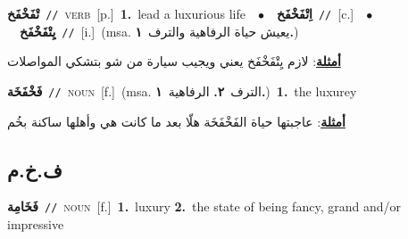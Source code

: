 \documentclass[10pt,a4paper,twoside]{article} %
\begin{document}
\begin{multicols}{2}
{\setlength\topsep{0pt}\textbf{\foreignlanguage{arabic}{تْفَخْفَخ}}\ {\color{gray}\texttt{//}\color{black}}\ \textsc{verb}\ [p.]\ \textbf{1.}~lead a luxurious life\ \ $\bullet$\ \ \setlength\topsep{0pt}\textbf{\foreignlanguage{arabic}{اِتْفَخْفَخ}}\ {\color{gray}\texttt{//}\color{black}}\ [c.]\ \ $\bullet$\ \ \setlength\topsep{0pt}\textbf{\foreignlanguage{arabic}{يِتْفَخْفَخ}}\ {\color{gray}\texttt{//}\color{black}}\ [i.]\ \color{gray}(msa. \foreignlanguage{arabic}{يعيش حياة الرفاهية والترف}~\foreignlanguage{arabic}{\textbf{١.}})\color{black}\  \begin{flushright}\color{gray}\foreignlanguage{arabic}{\textbf{\underline{\foreignlanguage{arabic}{أمثلة}}}: لازم يِتْفَخْفَخ يعني ويجيب سيارة من شو بتشكي المواصلات}\end{flushright}\color{black}} \vspace{2mm}

{\setlength\topsep{0pt}\textbf{\foreignlanguage{arabic}{فَخْفَخَة}}\ {\color{gray}\texttt{//}\color{black}}\ \textsc{noun}\ [f.]\ \color{gray}(msa. \foreignlanguage{arabic}{الترف}~\foreignlanguage{arabic}{\textbf{٢.}}  \foreignlanguage{arabic}{الرفاهية}~\foreignlanguage{arabic}{\textbf{١.}})\color{black}\ \textbf{1.}~the luxurey\  \begin{flushright}\color{gray}\foreignlanguage{arabic}{\textbf{\underline{\foreignlanguage{arabic}{أمثلة}}}: عاجبتها حياة الفَخْفَخَة هلّا بعد ما كانت هي وأهلها ساكنة بخُم}\end{flushright}\color{black}} \vspace{2mm}

\vspace{-3mm}
\subsection*{\color{blue}\foreignlanguage{arabic}{ف.خ.م}\color{blue}{}} 

{\setlength\topsep{0pt}\textbf{\foreignlanguage{arabic}{فَخَامِة}}\ {\color{gray}\texttt{//}\color{black}}\ \textsc{noun}\ [f.]\ \textbf{1.}~luxury  \textbf{2.}~the state of being fancy, grand and/or impressive\ } \vspace{2mm}


\end{multicols}
\end{document}
